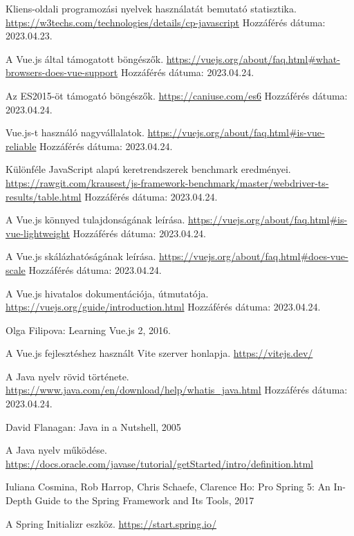 \documentclass[12pt]{article}
\begin{document}
\begin{thebibliography}{99}
Kliens-oldali programozási nyelvek használatát bemutató statisztika. \url{https://w3techs.com/technologies/details/cp-javascript}  Hozzáférés dátuma: 2023.04.23.

A Vue.js által támogatott böngészők. \url{https://vuejs.org/about/faq.html#what-browsers-does-vue-support} Hozzáférés dátuma: 2023.04.24.

Az ES2015-öt támogató böngészők. \url{https://caniuse.com/es6} Hozzáférés dátuma: 2023.04.24.

Vue.js-t használó nagyvállalatok. \url{https://vuejs.org/about/faq.html#is-vue-reliable} Hozzáférés dátuma: 2023.04.24.

Különféle JavaScript alapú keretrendszerek benchmark eredményei. \url{https://rawgit.com/krausest/js-framework-benchmark/master/webdriver-ts-results/table.html} Hozzáférés dátuma: 2023.04.24.

A Vue.js könnyed tulajdonságának leírása. \url{https://vuejs.org/about/faq.html#is-vue-lightweight} Hozzáférés dátuma: 2023.04.24.

A Vue.js skálázhatóságának leírása. \url{https://vuejs.org/about/faq.html#does-vue-scale} Hozzáférés dátuma: 2023.04.24.

A Vue.js hivatalos dokumentációja, útmutatója. \url{https://vuejs.org/guide/introduction.html} Hozzáférés dátuma: 2023.04.24.

Olga Filipova: Learning Vue.js 2, 2016.

A Vue.js fejlesztéshez használt Vite szerver honlapja. \url{https://vitejs.dev/}

A Java nyelv rövid története. \url{https://www.java.com/en/download/help/whatis_java.html} Hozzáférés dátuma: 2023.04.24.

David Flanagan: Java in a Nutshell, 2005

A Java nyelv működése. \url{https://docs.oracle.com/javase/tutorial/getStarted/intro/definition.html}

Iuliana Cosmina, Rob Harrop, Chris Schaefe, Clarence Ho: Pro Spring 5: An In-Depth Guide to the Spring Framework and Its Tools, 2017

A Spring Initializr eszköz. \url{https://start.spring.io/}


\end{thebibliography}
\end{document}
